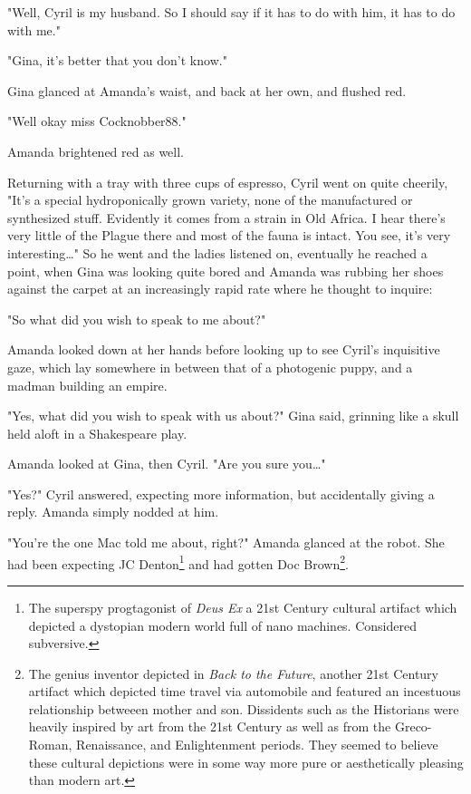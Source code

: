 \documentclass[12pt]{book}
\begin{document}
"Well, Cyril is my husband. So I should say if it has to do with him, it has to do with me."

"Gina, it's better that you don't know."

Gina glanced at Amanda's waist, and back at her own, and flushed red.

"Well okay miss Cocknobber88."

Amanda brightened red as well.

Returning with a tray with three cups of espresso, Cyril went on quite cheerily, "It's a special hydroponically grown variety, none of the manufactured or synthesized stuff. Evidently it comes from a strain in Old Africa. I hear there's very little of the Plague there and most of the fauna is intact. You see, it's very interesting\ldots{}" So he went and the ladies listened on, eventually he reached a point, when Gina was looking quite bored and Amanda was rubbing her shoes against the carpet at an increasingly rapid rate where he thought to inquire:

"So what did you wish to speak to me about?"

Amanda looked down at her hands before looking up to see Cyril's inquisitive gaze, which lay somewhere in between that of a photogenic puppy, and a madman building an empire.

"Yes, what did you wish to speak with us about?" Gina said, grinning like a skull held aloft in a Shakespeare play.

Amanda looked at Gina, then Cyril. "Are you sure you\ldots{}"

"Yes?" Cyril answered, expecting more information, but accidentally giving a reply. Amanda simply nodded at him.

"You're the one Mac told me about, right?" Amanda glanced at the robot. She had been expecting JC Denton\footnote{The superspy progtagonist of \emph{Deus Ex} a 21st Century cultural artifact which depicted a dystopian modern world full of nano machines. Considered subversive.} and had gotten Doc Brown\footnote{The genius inventor depicted in \emph{Back to the Future}, another 21st Century artifact which depicted time travel via automobile and featured an incestuous relationship betweeen mother and son. Dissidents such as the Historians were heavily inspired by art from the 21st Century as well as from the Greco-Roman, Renaissance, and Enlightenment periods. They seemed to believe these cultural depictions were in some way more pure or aesthetically pleasing than modern art.}.
\end{document}
